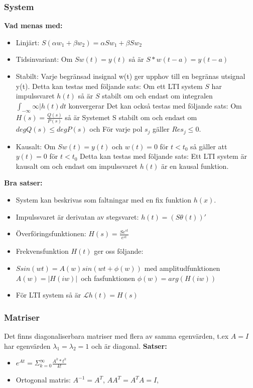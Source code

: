\documentclass[twocolumn,a4paper]{article}
\begin{document}
\subsubsection*{System}
\textbf{Vad menas med:} 
\begin{itemize}
    \item Linjärt: $S(\alpha w_1 + \beta w_2) = \alpha S w_1 + \beta S w_2$
    \item Tidsinvariant: Om $S w(t) = y(t)$ så är $S*w(t-a) = y(t-a)$
    \item Stabilt: Varje begränsad insignal w(t) ger upphov till en begränas utsignal y(t). 
    \newline
    Detta kan testas med följande sats: \newline
    Om ett LTI system $S$ har impulssvaret $h(t)$ så är $S$ stabilt om och endast om integralen $\int_{-\infty}{\infty} |h(t) dt$ konvergerar
    Det kan också testas med följande sats: \newline
    Om $H(s) = \frac{Q(s)}{P(s)}$ så är Systemet S stabilt om och endast om $deg Q(s) \leq deg P(s)$ och För varje pol $s_j$ gäller $Re s_j \le 0$.
    \item  Kausalt: Om $S w(t) = y(t)$ och $w(t) = 0$ för $t < t_0$ så gäller att $y(t) = 0$ för $ t < t_0$ 
    \newline
    Detta kan testas med följande sats: \newline
    Ett LTI system är kausalt om och endast om impulssvaret $h(t)$ är en kausal funktion. 
\end{itemize}

\textbf{Bra satser:}\newline
\begin{itemize}
    \item System kan beskrivas som faltningar med en fix funktion $h(x)$. 
    \item Impulssvaret är derivatan av stegsvaret: $h(t) = (S\theta(t))'$
    \item Överföringsfunktionen: $H(s) = \frac{Se^{st}}{e^{st}}$
    \item Frekvensfunktion $H(t)$ ger oss följande:
    \item $S sin(w t) = A(w) sin(wt+ \phi(w))$ med amplitudfunktionen $A(w) = |H(iw)|$ och fasfunktionen $\phi(w) = arg(H(iw))$
    \item För LTI system så är $\mathcal{L} h(t) = H(s)$
\end{itemize}

\subsubsection*{Matriser}
Det finns diagonaliserbara matriser med flera av samma egenvärden, t.ex $A = I$ har egenvärden $\lambda_1 = \lambda_2 = 1$ och är diagonal.
\newline
\textbf{Satser:}
\begin{itemize}
    \item $e^{At} = \Sigma^{\infty}_{k=0} \frac{A^k*t^k}{k!}$
    \item Ortogonal matris: $A^{-1}=A^T$, $AA^T=A^TA=I$, %
    
\end{itemize}



\end{document}
